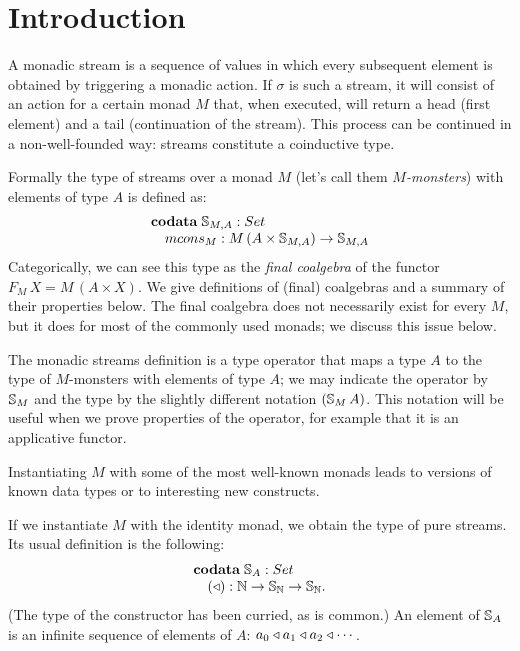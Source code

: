 \section{Introduction}

A monadic stream is a sequence of values in which every subsequent element is obtained by triggering a monadic action.
If $\sigma$ is such a stream, it will consist of an action for a certain monad $M$ that, when executed, will return a head (first element) and a tail (continuation of the stream).
This process can be continued in a non-well-founded way: streams constitute a coinductive type.

Formally the type of streams over a monad $M$ (let's call them {\em $M$-monsters}) with elements of type $A$ is defined as:
$$
\begin{array}[t]{l}
\codata\;
\stream{M,A}:\set\\
\quad \mcons_M: M\,(A\times \stream{M,A})\rightarrow\stream{M,A}
\end{array}
$$
Categorically, we can see this type as the {\em final coalgebra} of the functor $F_M\,X = M\,(A\times X)$.
We give definitions of (final) coalgebras and a summary of their properties below.
The final coalgebra does not necessarily exist for every $M$, 
but it does for most of the commonly used monads;
we discuss this issue below.

The monadic streams definition is a type operator that maps a type $A$ to the type of $M$-monsters with elements of type $A$; we may indicate the operator by $\mathbb{S}_{M}$ and the type by the slightly different notation $(\mathbb{S}_{M}\,A)$.
This notation will be useful when we prove properties of the operator, for example that it is an applicative functor.

Instantiating $M$ with some of the most well-known monads leads to versions of known data types or to interesting new constructs.

If we instantiate $M$ with the identity monad, we obtain the type of pure streams.
Its usual definition is the following:
$$
\begin{array}[t]{l}
\codata\;
\stream{A}:\set\\
\quad (\scons): \nat\rightarrow \stream{\nat} \rightarrow\stream{\nat}.
\end{array}
$$
(The type of the constructor has been curried, as is common.)
An element of $\mathbb{S}_{A}$ is an infinite sequence of elements of $A$: $a_0 \triangleleft a_1\triangleleft a_2\triangleleft \cdots$.


